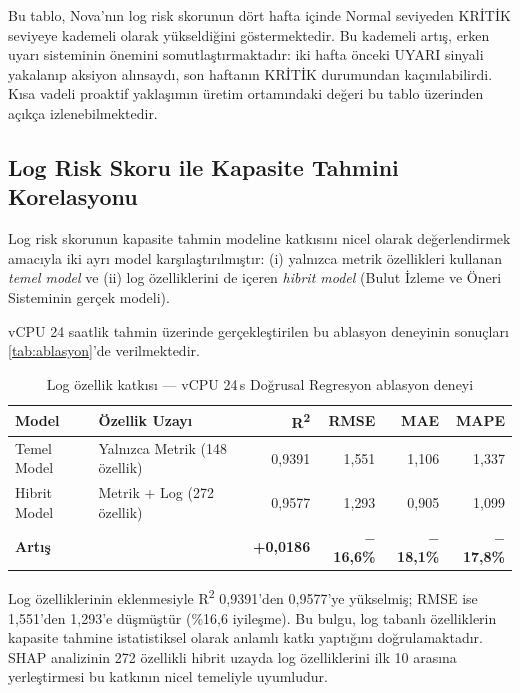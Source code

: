 Bu tablo, Nova'nın log risk skorunun dört hafta içinde Normal seviyeden KRİTİK seviyeye kademeli olarak yükseldiğini göstermektedir.
Bu kademeli artış, erken uyarı sisteminin önemini somutlaştırmaktadır: iki hafta önceki UYARI sinyali yakalanıp aksiyon alınsaydı, son haftanın KRİTİK durumundan kaçınılabilirdi.
Kısa vadeli proaktif yaklaşımın üretim ortamındaki değeri bu tablo üzerinden açıkça izlenebilmektedir.

\subsection{Log Risk Skoru ile Kapasite Tahmini Korelasyonu}

Log risk skorunun kapasite tahmin modeline katkısını nicel olarak değerlendirmek amacıyla iki ayrı model karşılaştırılmıştır:
(i) yalnızca metrik özellikleri kullanan \textit{temel model} ve (ii) log özelliklerini de içeren \textit{hibrit model} (Bulut İzleme ve Öneri Sisteminin gerçek modeli).

vCPU 24 saatlik tahmin üzerinde gerçekleştirilen bu ablasyon deneyinin sonuçları \autoref{tab:ablasyon}'de verilmektedir.

\begin{table}[htbp]
    \centering
    \caption{Log özellik katkısı — vCPU 24\,s Doğrusal Regresyon ablasyon deneyi}
    \label{tab:ablasyon}
    \begin{tabular}{llrrrr}
        \textbf{Model} & \textbf{Özellik Uzayı} & \textbf{R\textsuperscript{2}} & \textbf{RMSE} & \textbf{MAE} & \textbf{MAPE} \\
        \hline
        Temel Model  & Yalnızca Metrik (148 özellik) & 0{,}9391 & 1{,}551 & 1{,}106 & 1{,}337 \\
        Hibrit Model & Metrik + Log (272 özellik)    & 0{,}9577 & 1{,}293 & 0{,}905 & 1{,}099 \\
        \multicolumn{2}{l}{\textbf{Artış}} & \textbf{+0{,}0186} & \textbf{$-$16{,}6\%} & \textbf{$-$18{,}1\%} & \textbf{$-$17{,}8\%} \\
    \end{tabular}
\end{table}

Log özelliklerinin eklenmesiyle R\textsuperscript{2} 0{,}9391'den 0{,}9577'ye yükselmiş; RMSE ise 1{,}551'den 1{,}293'e düşmüştür (\%16{,}6 iyileşme).
Bu bulgu, log tabanlı özelliklerin kapasite tahmine istatistiksel olarak anlamlı katkı yaptığını doğrulamaktadır.
SHAP analizinin 272 özellikli hibrit uzayda log özelliklerini ilk 10 arasına yerleştirmesi bu katkının nicel temeliyle uyumludur.
